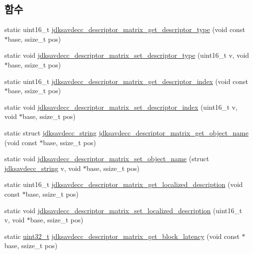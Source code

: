 \subsection*{함수}
\begin{DoxyCompactItemize}
\item 
static uint16\+\_\+t \hyperlink{group__descriptor__matrix_ga9e0b0f1066bd86843f7ee52e91d36a0a}{jdksavdecc\+\_\+descriptor\+\_\+matrix\+\_\+get\+\_\+descriptor\+\_\+type} (void const $\ast$base, ssize\+\_\+t pos)
\item 
static void \hyperlink{group__descriptor__matrix_gac1f9609b846df5762655a5958e7c7c23}{jdksavdecc\+\_\+descriptor\+\_\+matrix\+\_\+set\+\_\+descriptor\+\_\+type} (uint16\+\_\+t v, void $\ast$base, ssize\+\_\+t pos)
\item 
static uint16\+\_\+t \hyperlink{group__descriptor__matrix_ga012d85473a12e92c20815589b48e8b8e}{jdksavdecc\+\_\+descriptor\+\_\+matrix\+\_\+get\+\_\+descriptor\+\_\+index} (void const $\ast$base, ssize\+\_\+t pos)
\item 
static void \hyperlink{group__descriptor__matrix_gaff8d6709530beca8aa5e9338104b0b49}{jdksavdecc\+\_\+descriptor\+\_\+matrix\+\_\+set\+\_\+descriptor\+\_\+index} (uint16\+\_\+t v, void $\ast$base, ssize\+\_\+t pos)
\item 
static struct \hyperlink{structjdksavdecc__string}{jdksavdecc\+\_\+string} \hyperlink{group__descriptor__matrix_ga93cfa2b3e049a3a3494abb541353f510}{jdksavdecc\+\_\+descriptor\+\_\+matrix\+\_\+get\+\_\+object\+\_\+name} (void const $\ast$base, ssize\+\_\+t pos)
\item 
static void \hyperlink{group__descriptor__matrix_gac8f597cc44cf27f4fd60ea008258112f}{jdksavdecc\+\_\+descriptor\+\_\+matrix\+\_\+set\+\_\+object\+\_\+name} (struct \hyperlink{structjdksavdecc__string}{jdksavdecc\+\_\+string} v, void $\ast$base, ssize\+\_\+t pos)
\item 
static uint16\+\_\+t \hyperlink{group__descriptor__matrix_gae79c65e0a3f1a2209078196924d3a235}{jdksavdecc\+\_\+descriptor\+\_\+matrix\+\_\+get\+\_\+localized\+\_\+description} (void const $\ast$base, ssize\+\_\+t pos)
\item 
static void \hyperlink{group__descriptor__matrix_ga523f678806a8d03276e5a5fbff3bf5c8}{jdksavdecc\+\_\+descriptor\+\_\+matrix\+\_\+set\+\_\+localized\+\_\+description} (uint16\+\_\+t v, void $\ast$base, ssize\+\_\+t pos)
\item 
static \hyperlink{parse_8c_a6eb1e68cc391dd753bc8ce896dbb8315}{uint32\+\_\+t} \hyperlink{group__descriptor__matrix_ga87ec4e64485477883f4d962511f39fe1}{jdksavdecc\+\_\+descriptor\+\_\+matrix\+\_\+get\+\_\+block\+\_\+latency} (void const $\ast$base, ssize\+\_\+t pos)

\end{DoxyCompactItemize}
